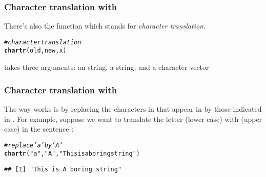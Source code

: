 \documentclass[12pt]{beamer}\usepackage[]{graphicx}\usepackage[]{color}
\makeatletter
\newcommand{\hlstr}[1]{\textcolor[rgb]{0.192,0.494,0.8}{#1}}%
\newcommand{\hlcom}[1]{\textcolor[rgb]{0.678,0.584,0.686}{\textit{#1}}}%
\newcommand{\hlstd}[1]{\textcolor[rgb]{0.345,0.345,0.345}{#1}}%
\newcommand{\hlkwd}[1]{\textcolor[rgb]{0.737,0.353,0.396}{\textbf{#1}}}%
\newenvironment{kframe}{%
 \def\at@end@of@kframe{}%
 \ifinner\ifhmode%
  \def\at@end@of@kframe{\end{minipage}}%
  \begin{minipage}{\columnwidth}%
 \fi\fi%
 \def\FrameCommand##1{\hskip\@totalleftmargin \hskip-\fboxsep
 \colorbox{shadecolor}{##1}\hskip-\fboxsep
     \hskip-\linewidth \hskip-\@totalleftmargin \hskip\columnwidth}%
 \MakeFramed {\advance\hsize-\width
   \@totalleftmargin\z@ \linewidth\hsize
   \@setminipage}}%
 {\par\unskip\endMakeFramed%
 \at@end@of@kframe}
\newenvironment{knitrout}{}{} %
\makeatother
\begin{document}

\begin{frame}[fragile]
\frametitle{Character translation with }

There's also the function  which stands for \textit{character translation}. 
\begin{knitrout}\footnotesize
{}\color{fgcolor}\begin{kframe}
\begin{alltt}
\hlcom{# character translation}
\hlkwd{chartr}\hlstd{(old, new, x)}
\end{alltt}
\end{kframe}
\end{knitrout}

 takes three arguments: an  string, a  string, and a character vector 

\end{frame}


\begin{frame}[fragile]
\frametitle{Character translation with }

The way  works is by replacing the characters in  that appear in  by those indicated in . For example, suppose we want to translate the letter  (lower case) with  (upper case) in the sentence :
\begin{knitrout}\footnotesize
{}\color{fgcolor}\begin{kframe}
\begin{alltt}
\hlcom{# replace 'a' by 'A'}
\hlkwd{chartr}\hlstd{(}\hlstr{"a"}\hlstd{,} \hlstr{"A"}\hlstd{,} \hlstr{"This is a boring string"}\hlstd{)}
\end{alltt}
\begin{verbatim}
## [1] "This is A boring string"
\end{verbatim}
\end{kframe}
\end{knitrout}

\end{frame}

\end{document}
